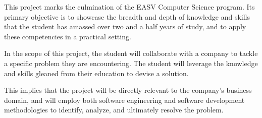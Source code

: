 This project marks the culmination of the EASV Computer Science program. 
Its primary objective is to showcase the breadth and depth of knowledge 
and skills that the student has amassed over two and a half years of study,
and to apply these competencies in a practical setting.

In the scope of this project, the student will collaborate with a company 
to tackle a specific problem they are encountering.
The student will leverage the knowledge and skills gleaned from their education
to devise a solution.

This implies that the project will be directly relevant to the company's business domain,
and will employ both software engineering and software development methodologies
to identify, analyze, and ultimately resolve the problem.